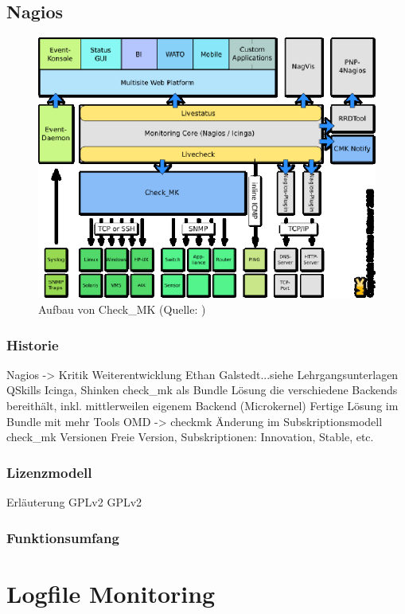 \documentclass[12pt,a4paper,parskip]{scrreprt}
\begin{document}
	\subsection{Nagios}
	\begin{figure}
	\centering
	\includegraphics[]{pics/OMD_Schema.eps}
    \caption[Aufbau von Check\_MK]{Aufbau von Check\_MK (Quelle: \cite{checkmk})}
	\end{figure}
	\subsubsection{Historie}
	Nagios -> Kritik Weiterentwicklung Ethan Galstedt...siehe Lehrgangsunterlagen QSkills
	Icinga, Shinken
	check\_mk als Bundle Lösung die verschiedene Backends bereithält, inkl. mittlerweilen eigenem Backend (Microkernel)
	Fertige Lösung im Bundle mit mehr Tools
	OMD -> checkmk Änderung im Subskriptionsmodell
	check\_mk Versionen Freie Version, Subskriptionen: Innovation, Stable, etc.
	
	\subsubsection{Lizenzmodell}
	Erläuterung GPLv2
	\gls{GPLv2}
	\subsubsection{Funktionsumfang}
	\section{Logfile Monitoring}
\end{document}
